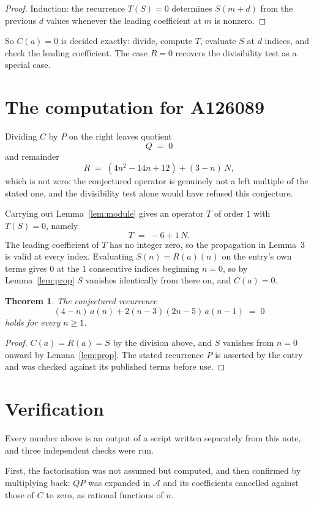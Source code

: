 \documentclass[11pt,a4paper]{article}
\theoremstyle{plain}
\newtheorem{theorem}{Theorem}
\theoremstyle{definition}
\begin{document}
\begin{proof}
Induction: the recurrence $T(S)=0$ determines $S(m+d)$ from the previous $d$ values
whenever the leading coefficient at $m$ is nonzero.
\end{proof}

So $C(a)=0$ is decided exactly: divide, compute $T$, evaluate $S$ at $d$ indices, and check
the leading coefficient. The case $R=0$ recovers the divisibility test as a special case.

\section{The computation for A126089}

Dividing $C$ by $P$ on the right leaves quotient
\[
Q\;=\;0
\]
and remainder
\[
R\;=\;\left(4 n^{2} - 14 n + 12\right) + \left(3 - n\right)\,N ,
\]
which is not zero: the conjectured operator is genuinely not a left multiple of the stated
one, and the divisibility test alone would have refused this conjecture.

Carrying out Lemma~\ref{lem:module} gives an operator $T$ of order $1$ with
$T(S)=0$, namely
\[
T\;=\;-6 + 1\,N .
\]
The leading coefficient of $T$ has no integer zero, so the propagation in Lemma~3 is valid at every index. Evaluating $S(n)=R(a)(n)$ on the entry's own terms gives $0$ at the
$1$ consecutive indices beginning $n=0$, so by Lemma~\ref{lem:prop}
$S$ vanishes identically from there on, and $C(a)=0$.

\begin{theorem}
The conjectured recurrence
\[
(4 - n)\,a(n) + 2 \left(n - 3\right) \left(2 n - 5\right)\,a(n-1) \;=\;0
\]
holds for every $n\ge1$.
\end{theorem}

\begin{proof}
$C(a)=R(a)=S$ by the division above, and $S$ vanishes from $n=0$ onward by
Lemma~\ref{lem:prop}. The stated recurrence $P$ is asserted by the entry and was checked
against its published terms before use.
\end{proof}

\section{Verification}

Every number above is an output of a script written separately from this note, and three
independent checks were run.

First, the factorisation was not assumed but computed, and then confirmed by multiplying
back: $QP$ was expanded in $\mathcal{A}$ and its coefficients cancelled against those of
$C$ to zero, as rational functions of $n$.
\end{document}
